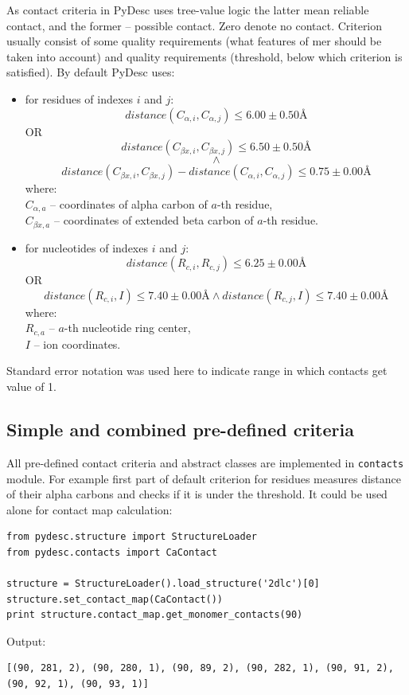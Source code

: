 \documentclass{article}
\begin{document}
As contact criteria in PyDesc uses tree-value logic the latter mean reliable contact, and the former -- possible contact. Zero denote no contact. Criterion usually consist of some quality requirements (what features of mer should be taken into account) and quality requirements (threshold, below which criterion is satisfied). By default PyDesc uses:
\begin{itemize}
    \item for residues of indexes $i$ and $j$:
    $$distance(C_{\alpha{}, i}, C_{\alpha{}, j}) \leq 6.00 \pm 0.50 \textrm{\AA}$$
    OR
    $$distance(C_{\beta{}x, i}, C_{\beta{}x, j}) \leq 6.50 \pm 0.50 \textrm{\AA}$$
    $$\land$$
    $$distance(C_{\beta{}x, i}, C_{\beta{}x, j}) - distance(C_{\alpha{}, i}, C_{\alpha{}, j}) \leq 0.75 \pm 0.00 \textrm{\AA}$$
    where:\\
    $C_{\alpha{}, a}$ -- coordinates of alpha carbon of $a$-th residue,\\
    $C_{\beta{}x, a}$ -- coordinates of extended beta carbon of $a$-th residue.
    \item for nucleotides of indexes $i$ and $j$:
    $$distance(R_{c, i}, R_{c, j}) \leq 6.25 \pm 0.00 \textrm{\AA}$$
    OR
    $$distance(R_{c, i}, I) \leq 7.40 \pm 0.00 \textrm{\AA} \land{} distance(R_{c, j}, I) \leq 7.40 \pm 0.00 \textrm{\AA}$$
    where:\\
    $R_{c, a}$ -- $a$-th nucleotide ring center,\\
    $I$ -- ion coordinates.
\end{itemize}

Standard error notation was used here to indicate range in which contacts get value of 1.

%
%
\subsection{Simple and combined pre-defined criteria}

All pre-defined contact criteria and abstract classes are implemented in \texttt{contacts} module. For example first part of default criterion for residues measures distance of their alpha carbons and checks if it is under the threshold. It could be used alone for contact map calculation:

\begin{lstlisting}
from pydesc.structure import StructureLoader
from pydesc.contacts import CaContact

structure = StructureLoader().load_structure('2dlc')[0]
structure.set_contact_map(CaContact())
print structure.contact_map.get_monomer_contacts(90)
\end{lstlisting}
Output:
\begin{lstlisting}
[(90, 281, 2), (90, 280, 1), (90, 89, 2), (90, 282, 1), (90, 91, 2), (90, 92, 1), (90, 93, 1)]
\end{lstlisting}
\end{document}
